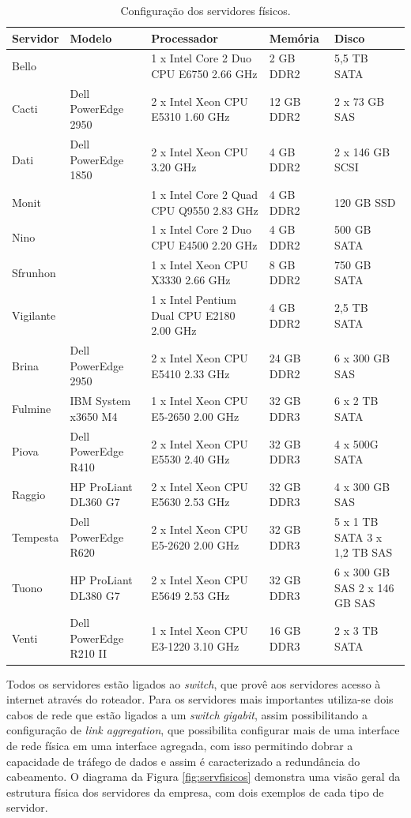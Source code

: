 \begin{table}
\caption{Configuração dos servidores físicos.}
\label{tab:servfisicos}
\begin{center}
\begin{tabular}{|l|l|p{4cm}|l|p{2.1cm}|}\hline
Servidor & Modelo & Processador & Memória & Disco\\\hline
Bello & & 1 x Intel Core 2 Duo CPU E6750 2.66 GHz & 2 GB DDR2 & 5,5 TB SATA\\\hline
Cacti & Dell PowerEdge 2950 & 2 x Intel Xeon CPU E5310 1.60 GHz & 12 GB DDR2 & 2 x 73 GB SAS\\\hline
Dati & Dell PowerEdge 1850 & 2 x Intel Xeon CPU 3.20 GHz & 4 GB DDR2 & 2 x 146 GB SCSI\\\hline
Monit & & 1 x Intel Core 2 Quad CPU Q9550 2.83 GHz & 4 GB DDR2 & 120 GB SSD\\\hline
Nino & & 1 x Intel Core 2 Duo CPU E4500 2.20 GHz & 4 GB DDR2 & 500 GB SATA\\\hline
Sfrunhon & & 1 x Intel Xeon CPU X3330 2.66 GHz & 8 GB DDR2 & 750 GB SATA\\\hline
Vigilante & & 1 x Intel Pentium Dual CPU E2180 2.00 GHz & 4 GB DDR2 & 2,5 TB SATA\\\hline
Brina & Dell PowerEdge 2950 & 2 x Intel Xeon CPU E5410 2.33 GHz & 24 GB DDR2 & 6 x 300 GB SAS\\\hline
Fulmine & IBM System x3650 M4 & 1 x Intel Xeon CPU E5-2650 2.00 GHz & 32 GB DDR3 & 6 x 2 TB SATA\\\hline
Piova & Dell PowerEdge R410 & 2 x Intel Xeon CPU E5530 2.40 GHz & 32 GB DDR3 & 4 x 500G SATA\\\hline
Raggio & HP ProLiant DL360 G7 & 2 x  Intel Xeon CPU E5630 2.53 GHz & 32 GB DDR3 & 4 x 300 GB SAS\\\hline
Tempesta & Dell PowerEdge R620 & 2 x Intel Xeon CPU E5-2620 2.00 GHz & 32 GB DDR3 & 5 x 1 TB SATA 3 x 1,2 TB SAS\\\hline
Tuono & HP ProLiant DL380 G7 & 2 x Intel Xeon CPU E5649 2.53 GHz & 32 GB DDR3 & 6 x 300 GB SAS 2 x 146 GB SAS\\\hline
Venti & Dell PowerEdge R210 II & 1 x Intel Xeon CPU E3-1220 3.10 GHz & 16 GB DDR3 & 2 x 3 TB SATA\\\hline
\end{tabular}
\end{center}
\end{table}

Todos os servidores estão ligados ao \textit{switch}, que provê aos servidores acesso à internet através do roteador. 
Para os servidores mais importantes utiliza-se dois cabos de rede que estão ligados a um \textit{switch} \textit{gigabit}, assim possibilitando
a configuração de \textit{link aggregation}, que possibilita configurar mais de uma interface de rede física em uma interface agregada, com isso 
permitindo dobrar a capacidade de tráfego de dados e assim é caracterizado a redundância do cabeamento.
O diagrama da Figura \ref{fig:servfisicos} demonstra uma visão geral da estrutura física dos servidores da empresa, com dois exemplos de cada 
tipo de servidor. 

